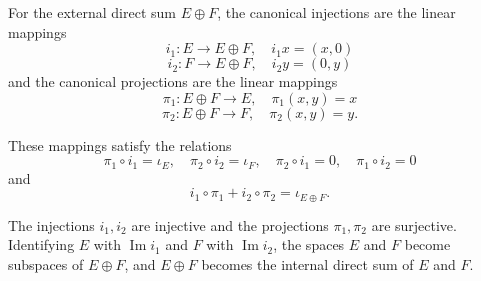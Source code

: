 For the external direct sum $E \oplus F$, the canonical injections are the linear mappings
$$i_1: E \to E \oplus F, \quad i_1 x = (x, 0)$$
$$i_2: F \to E \oplus F, \quad i_2 y = (0, y)$$
and the canonical projections are the linear mappings
$$\pi_1: E \oplus F \to E, \quad \pi_1(x, y) = x$$
$$\pi_2: E \oplus F \to F, \quad \pi_2(x, y) = y.$$

These mappings satisfy the relations
$$\pi_1 \circ i_1 = \iota_E, \quad \pi_2 \circ i_2 = \iota_F, \quad \pi_2 \circ i_1 = 0, \quad \pi_1 \circ i_2 = 0$$
and
$$i_1 \circ \pi_1 + i_2 \circ \pi_2 = \iota_{E \oplus F}.$$

The injections $i_1, i_2$ are injective and the projections $\pi_1, \pi_2$ are surjective. Identifying $E$ with $\operatorname{Im} i_1$ and $F$ with $\operatorname{Im} i_2$, the spaces $E$ and $F$ become subspaces of $E \oplus F$, and $E \oplus F$ becomes the internal direct sum of $E$ and $F$.
